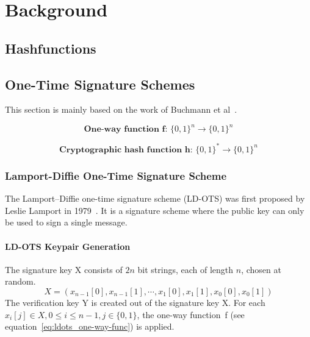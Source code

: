 \chapter{Background}
\label{cha:background}


\section{Hashfunctions}

\section{One-Time Signature Schemes}
This section is mainly based on the work of Buchmann et al~\cite{book_pqc_bernstein_2004}.



\begin{equation}
\label{eq:ldots_one-way-func}
\textbf{One-way function f: } \lbrace 0,1 \rbrace^n \rightarrow \lbrace 0,1 \rbrace ^n
\end{equation}

\begin{equation}
\label{eq:ldots_basic_hashfunc}
\textbf{Cryptographic hash function h: } \lbrace 0,1 \rbrace^* \rightarrow \lbrace 0,1 \rbrace^n
\end{equation}

\subsection{Lamport-Diffie One-Time Signature Scheme}
The Lamport–Diffie one-time signature scheme (LD-OTS) was first proposed by Leslie Lamport in 1979~\cite{lamport_signature_scheme_1979}. 
It is a signature scheme where the public key can only be used to sign a single message.


\subsubsection{LD-OTS Keypair Generation}
The signature key X consists of $2n$ bit strings, each of length $n$, chosen at random. %
\begin{equation}
\label{eq:ldots_sign_key}
X = \left(x_{n-1}\left[0\right], x_{n-1}\left[1\right], \cdots, x_{1}\left[0\right], x_{1}\left[1\right], x_{0}\left[0\right], x_{0}\left[1\right] \right)
\end{equation}
The verification key Y is created out of the signature key X. For each $x_i[j] \in X, 0 \leq i \leq n-1, j \in \lbrace 0,1 \rbrace$, the one-way function~f (see equation~\ref{eq:ldots_one-way-func}) is applied.

